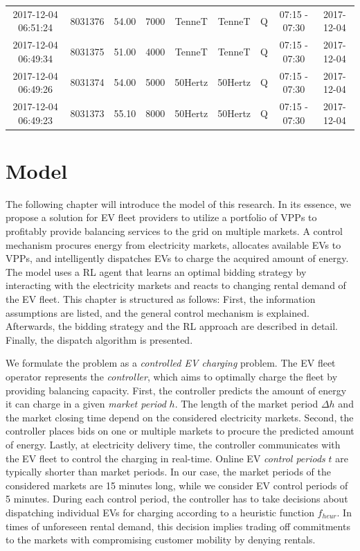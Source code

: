 \documentclass[a4paper, 12pt]{article}
\begin{document}
{\begin{table}
\begin{tabular}{c|cccccccc}
2017-12-04 06:51:24 & 8031376 & 54.00 & 7000 & TenneT & TenneT & Q & 07:15 - 07:30 & 2017-12-04\\
2017-12-04 06:49:34 & 8031375 & 51.00 & 4000 & TenneT & TenneT & Q & 07:15 - 07:30 & 2017-12-04\\
2017-12-04 06:49:26 & 8031374 & 54.00 & 5000 & 50Hertz & 50Hertz & Q & 07:15 - 07:30 & 2017-12-04\\
2017-12-04 06:49:23 & 8031373 & 55.10 & 8000 & 50Hertz & 50Hertz & Q & 07:15 - 07:30 & 2017-12-04\\
\hline
\hline
\end{tabular}
\end{table}
}

\clearpage
\section{Model}
\label{sec:org3e02c05}
The following chapter will introduce the model of this research. In its essence,
we propose a solution for EV fleet providers to utilize a portfolio of VPPs to
profitably provide balancing services to the grid on multiple markets. A control
mechanism procures energy from electricity markets, allocates available EVs to
VPPs, and intelligently dispatches EVs to charge the acquired amount of energy.
The model uses a RL agent that learns an optimal bidding strategy by interacting
with the electricity markets and reacts to changing rental demand of the EV
fleet. This chapter is structured as follows: First, the information assumptions
are listed, and the general control mechanism is explained. Afterwards, the
bidding strategy and the RL approach are described in detail. Finally, the
dispatch algorithm is presented.

We formulate the problem as a \emph{controlled EV charging} problem. The EV fleet
operator represents the \emph{controller}, which aims to optimally charge the fleet
by providing balancing capacity. First, the controller predicts the amount of
energy it can charge in a given \emph{market period} \(h\). The length of the market
period \(\Delta h\) and the market closing time depend on the considered
electricity markets. Second, the controller places bids on one or multiple
markets to procure the predicted amount of energy. Lastly, at electricity
delivery time, the controller communicates with the EV fleet to control the
charging in real-time. Online EV \emph{control periods} \(t\) are typically shorter
than market periods. In our case, the market periods of the considered markets
are 15 minutes long, while we consider EV control periods of 5 minutes. During
each control period, the controller has to take decisions about dispatching
individual EVs for charging according to a heuristic function \(f_{heur}\). In
times of unforeseen rental demand, this decision implies trading off commitments
to the markets with compromising customer mobility by denying rentals.
\end{document}
